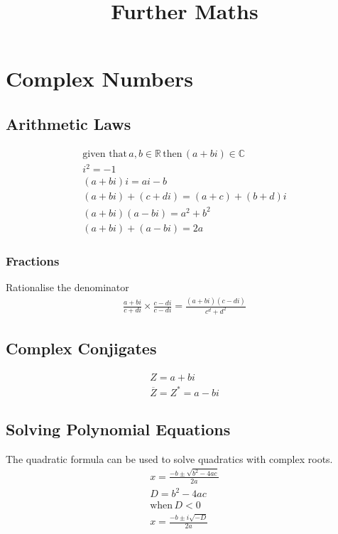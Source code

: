\documentclass{article}
\begin{document}
\title{Further Maths}
\maketitle

\section{Complex Numbers}

\subsection{Arithmetic Laws}
\begin{gather}
	\text{given that}\, a,b \in \mathbb{R}\, \text{then}\, (a + bi)\in \mathbb{C} \\
	i^2 = -1 \\
	(a+bi)i = ai - b \\
	(a + bi) + (c + di) = (a + c) + (b + d)i \\
	(a + bi)(a - bi) = a^2 + b^2 \\
	(a + bi) + (a - bi) = 2a
\end{gather}

\subsubsection{Fractions}
Rationalise the denominator
\begin{gather}
	\frac{a + bi}{c + di}
	\times \frac{c - di}{c - di}
	= \frac{(a + bi)(c - di)}{c^d + d^2}
\end{gather}

\subsection{Complex Conjigates}
\begin{gather}
	Z = a + b i \\
	\overline{Z} = Z^* = a - b i
\end{gather}

\subsection{Solving Polynomial Equations}
The quadratic formula can be used to solve quadratics with
complex roots.
\begin{gather}
	x = \frac{-b \pm \sqrt{b^2 - 4ac}}{2a} \\
	D = b^2 - 4ac \\
	\text{when}\, D < 0 \\
	x = \frac{-b \pm i\sqrt{-D}}{2a}
\end{gather}
\end{document}
